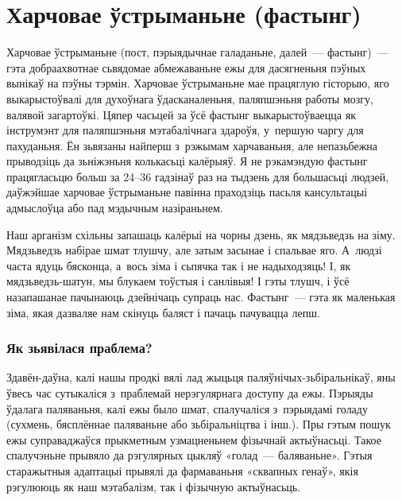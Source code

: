 \chapter{Харчовае ўстрыманьне (фастынг)}

Харчовае ўстрыманьне (пост, пэрыядычнае галаданьне, далей~--- фастынг)~--- гэта добраахвотнае сьвядомае абмежаваньне ежы для дасягненьня пэўных вынікаў на пэўны тэрмін. Харчовае ўстрыманьне мае працяглую гісторыю, яго выкарыстоўвалі для духоўнага ўдасканаленьня, паляпшэньня работы мозгу, валявой загартоўкі. Цяпер часьцей за ўсё фастынг выкарыстоўваецца як інструмэнт для паляпшэньня мэтабалічнага здароўя, у~першую чаргу для пахуданьня. Ён зьвязаны найперш з~рэжымам харчаваньня, але непазьбежна прыводзіць да зьніжэньня колькасьці калёрыяў. Я не рэкамэндую фастынг працягласьцю больш за 24--36 гадзінаў раз на тыдзень для большасьці людзей, даўжэйшае харчовае ўстрыманьне павінна праходзіць пасьля кансультацыі адмыслоўца або пад мэдычным назіраньнем.

Наш арганізм схільны запашаць калёрыі на чорны дзень, як мядзьведзь на зіму. Мядзьведзь набірае шмат тлушчу, але затым засынае і спальвае яго. А~людзі часта ядуць бясконца, а~вось зіма і сьпячка так і не надыходзяць! І, як мядзьведзь-шатун, мы блукаем тоўстыя і санлівыя! І гэты тлушч, і ўсё назапашанае пачынаюць дзейнічаць супраць нас. Фастынг~--- гэта як маленькая зіма, якая дазваляе нам скінуць баляст і пачаць пачувацца лепш.

\subsection{Як зьявілася праблема?}

Здавён-даўна, калі нашы продкі вялі лад жыцьця паляўнічых-зьбіральнікаў, яны ўвесь час сутыкаліся з~праблемай нерэгулярнага доступу да ежы. Пэрыяды ўдалага паляваньня, калі ежы было шмат, спалучаліся з~пэрыядамі голаду (сухмень, бясплённае паляваньне або зьбіральніцтва і інш.). Пры гэтым пошук ежы суправаджаўся прыкметным узмацненьнем фізычнай актыўнасьці. Такое спалучэньне прывяло да рэгулярных цыкляў «голад~--- баляваньне». Гэтыя старажытныя адаптацыі прывялі да фармаваньня «сквапных генаў», якія рэгулююць як наш мэтабалізм, так і фізычную актыўнасьць.

